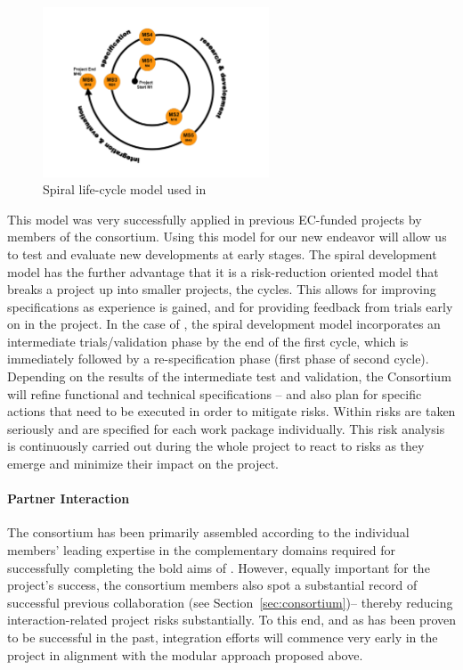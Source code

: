 \begin{figure}%
    \includegraphics[width=0.6\textwidth]{pics/spiralOverview.pdf}
   \caption{Spiral life-cycle model used in \Project}
\end{figure}
   \label{fig:spiral}

This model was very successfully applied in previous EC-funded projects by members of the consortium. Using this model for our new endeavor \Project{} will allow us to test and evaluate new developments at early stages.  The spiral development model has the further advantage that it is a risk-reduction oriented model that breaks a project up into smaller projects, the cycles. This allows for improving specifications as experience is gained, and for providing feedback from trials early on in the project.  In the case of \Project, the spiral development model incorporates an intermediate trials/validation phase by the end of the first cycle, which is immediately followed by a re-specification phase (first phase of second cycle). Depending on the results of the intermediate test and validation, the Consortium will refine functional and technical specifications -- and also plan for specific actions that need to be executed in order to mitigate risks.  Within \Project{} risks are taken seriously and are specified for each work package individually. This risk analysis is continuously carried out during the whole project to react to risks as they emerge and minimize their impact on the project.

\paragraph{\textbf{Partner Interaction}}

 The consortium has been primarily assembled according to the individual members' leading expertise in the complementary domains required for successfully completing the bold aims of \Project. However, equally important for the project's success, the consortium members also spot a substantial record of successful previous collaboration (see Section~\ref{sec:consortium})-- thereby reducing interaction-related project risks substantially. To this end, and as has been proven to be successful in the past, integration efforts will commence very early in the project in alignment with the modular approach proposed above.

